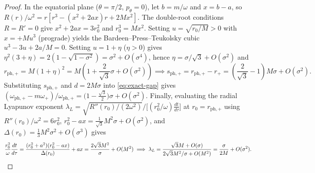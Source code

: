 \documentclass[11pt, a4paper]{article}
\theoremstyle{remark}
\begin{document}
\begin{proof}
In the equatorial plane ($\theta = \pi/2$, $p_\theta = 0$), let $b = m/\omega$ and $x = b - a$, so $R(r)/\omega^2 = r[r^3 - (x^2 + 2ax)r + 2Mx^2]$. The double-root conditions $R = R' = 0$ give $x^2 + 2ax = 3r_0^2$ and $r_0^3 = M x^2$. Setting $u = \sqrt{r_0/M} > 0$ with $x = +Mu^3$ (prograde) yields the Bardeen--Press--Teukolsky cubic $u^3 - 3u + 2a/M = 0$. Setting $u = 1 + \eta$ ($\eta > 0$) gives $\eta^2(3 + \eta) = 2(1 - \sqrt{1 - \sigma^2}) = \sigma^2 + O(\sigma^4)$, hence $\eta = \sigma/\sqrt{3} + O(\sigma^2)$ and
\begin{equation}
r_{\mathrm{ph},+} = M(1 + \eta)^2 = M\left(1 + \frac{2}{\sqrt{3}}\sigma + O(\sigma^2)\right) \implies s_{\mathrm{ph},+} = r_{\mathrm{ph},+} - r_+ = \left(\frac{2}{\sqrt{3}} - 1\right)M\sigma + O(\sigma^2).
\end{equation}
Substituting $s_{\mathrm{ph},+}$ and $d = 2M\sigma$ into \eqref{eq:exact-gap} gives $(\omega_{\mathrm{ph},+} - m\omega_+)/\omega_{\mathrm{ph},+} = \big(1 - \frac{\sqrt{3}}{2}\big)\sigma + O(\sigma^2)$. Finally, evaluating the radial Lyapunov exponent $\lambda_L = \sqrt{R''(r_0)/(2\omega^2)} / \big[(r_0^2/\omega)\frac{dt}{d\tau}\big]$ at $r_0 = r_{\mathrm{ph},+}$ using $R''(r_0)/\omega^2 = 6r_0^2$, $r_0^2 - ax = \frac{1}{\sqrt{3}}M^2\sigma + O(\sigma^2)$, and $\Delta(r_0) = \frac{1}{3}M^2\sigma^2 + O(\sigma^3)$ gives
\begin{equation}
\frac{r_0^2}{\omega}\frac{dt}{d\tau} = \frac{(r_0^2 + a^2)(r_0^2 - ax)}{\Delta(r_0)} + ax = \frac{2\sqrt{3}M^2}{\sigma} + O(M^2) \implies \lambda_L = \frac{\sqrt{3}M + O(\sigma)}{2\sqrt{3}M^2/\sigma + O(M^2)} = \frac{\sigma}{2M} + O(\sigma^2). \qedhere
\end{equation}
\end{proof}
\end{document}
